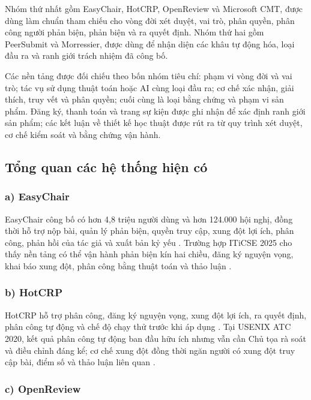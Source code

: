 Nhóm thứ nhất gồm EasyChair, HotCRP, OpenReview và Microsoft CMT, được dùng làm chuẩn tham chiếu cho vòng đời xét duyệt, vai trò, phân quyền, phân công người phản biện, phản biện và ra quyết định. Nhóm thứ hai gồm PeerSubmit và Morressier, được dùng để nhận diện các khâu tự động hóa, loại đầu ra và ranh giới trách nhiệm đã công bố.

Các nền tảng được đối chiếu theo bốn nhóm tiêu chí: phạm vi vòng đời và vai trò; tác vụ sử dụng thuật toán hoặc AI cùng loại đầu ra; cơ chế xác nhận, giải thích, truy vết và phân quyền; cuối cùng là loại bằng chứng và phạm vi sản phẩm. Đăng ký, thanh toán và trang sự kiện được ghi nhận để xác định ranh giới sản phẩm; các kết luận về thiết kế học thuật được rút ra từ quy trình xét duyệt, cơ chế kiểm soát và bằng chứng vận hành.

\subsection{Tổng quan các hệ thống hiện có}

\subsubsection{a) EasyChair}

EasyChair công bố có hơn 4,8 triệu người dùng và hơn 124.000 hội nghị, đồng thời hỗ trợ nộp bài, quản lý phản biện, quyền truy cập, xung đột lợi ích, phân công, phản hồi của tác giả và xuất bản kỷ yếu \cite{ch2ref1,ch2ref2}. Trường hợp ITiCSE 2025 cho thấy nền tảng có thể vận hành phản biện kín hai chiều, đăng ký nguyện vọng, khai báo xung đột, phân công bằng thuật toán và thảo luận \cite{ch2ref57}.

\subsubsection{b) HotCRP}

HotCRP hỗ trợ phân công, đăng ký nguyện vọng, xung đột lợi ích, ra quyết định, phân công tự động và chế độ chạy thử trước khi áp dụng \cite{ch2ref3,ch2ref4}. Tại USENIX ATC 2020, kết quả phân công tự động ban đầu hữu ích nhưng vẫn cần Chủ tọa rà soát và điều chỉnh đáng kể; cơ chế xung đột đồng thời ngăn người có xung đột truy cập bài, điểm số và thảo luận liên quan \cite{ch2ref58}.

\subsubsection{c) OpenReview}


